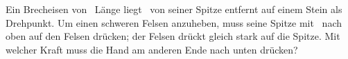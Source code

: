 Ein Brecheisen von \lBO\ Länge liegt \aSO\ von seiner Spitze entfernt auf einem Stein als Drehpunkt. Um einen schweren Felsen anzuheben, muss seine Spitze mit \FLO\ nach oben auf den Felsen drücken; der Felsen drückt gleich stark auf die Spitze. Mit welcher Kraft muss die Hand am anderen Ende nach unten drücken?
